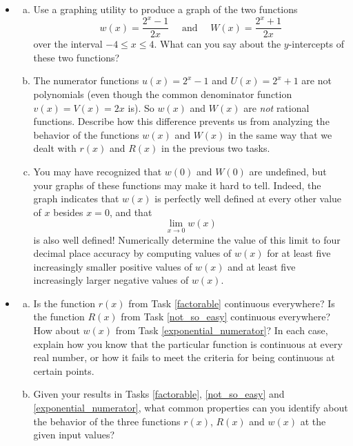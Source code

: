 \documentclass[11pt]{article}
\newcounter{tasknumb}
\newcommand{\tasknumb}[1]{\refstepcounter{tasknumb}\textmd{\textbf{$\fbox{$\fbox{Task \thetasknumb}$}$}}#1}
\newenvironment{task}[1][]%
 {\begin{itemize}
 \item[\tasknumb{#1}] }
{
    \end{itemize}    }%
\begin{document}
\bigskip
\begin{task}[\label{exponential_numerator}]
\begin{enumerate}[(a)] \itemsep -8pt
\item Use a graphing utility to produce a graph of the two functions $$w(x)=\frac{2^x-1}{2x}\quad\textrm{ and }\quad W(x)=\frac{2^x+1}{2x}$$over the interval $-4 \le x \le 4$. What can you say about the $y$-intercepts of these two functions? \\
\item The numerator functions $u(x)=2^x-1$ and $U(x)=2^x+1$ are not polynomials (even though the common denominator function $v(x)=V(x)=2x$ is). So $w(x)$ and $W(x)$ are \emph{not} rational functions. Describe how this difference prevents us from analyzing the behavior of the functions $w(x)$ and $W(x)$ in the same way that we dealt with $r(x)$ and $R(x)$ in the previous two tasks. \\
\item You may have recognized that $w(0)$ and $W(0)$ are undefined, but your graphs of these functions may make it hard to tell. Indeed, the graph indicates that $w(x)$ is perfectly well defined at every other value of $x$ besides $x=0$, and that $$\lim_{x\rightarrow 0} w(x)$$ is also well defined! Numerically determine the value of this limit to four decimal place accuracy by computing values of $w(x)$ for at least five increasingly smaller positive values of $w(x)$ and at least five increasingly larger negative values of $w(x)$.
\end{enumerate}
\end{task}

\newpage
\begin{task}[\label{continuity}]
\begin{enumerate}[(a)] \itemsep -8pt
\item Is the function $r(x)$ from Task \ref{factorable} continuous everywhere? Is the function $R(x)$ from Task \ref{not_so_easy} continuous everywhere? How about $w(x)$ from Task \ref{exponential_numerator}? In each case, explain how you know that the particular function is continuous at every real number, or how it fails to meet the criteria for being continuous at certain points. \\
\item Given your results in Tasks \ref{factorable}, \ref{not_so_easy} and \ref{exponential_numerator}, what common properties can you identify about the behavior of the three functions $r(x)$, $R(x)$ and $w(x)$ at the given input values?
\end{enumerate}
\end{task}
\end{document}
